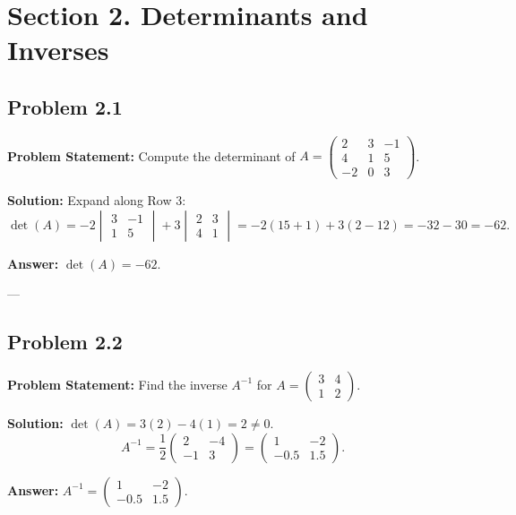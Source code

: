 \documentclass[11pt, a4paper]{article}
\begin{document}
\newpage

\section{Section 2. Determinants and Inverses}

\subsection*{Problem 2.1}
\textbf{Problem Statement:} Compute the determinant of $A = \begin{pmatrix} 2 & 3 & -1 \\ 4 & 1 & 5 \\ -2 & 0 & 3 \end{pmatrix}$.

\textbf{Solution:} Expand along Row 3:
$$ \det(A) = -2 \begin{vmatrix} 3 & -1 \\ 1 & 5 \end{vmatrix} + 3 \begin{vmatrix} 2 & 3 \\ 4 & 1 \end{vmatrix} = -2(15 + 1) + 3(2 - 12) = -32 - 30 = -62. $$

\textbf{Answer:} $\det(A) = -62$.

---

\subsection*{Problem 2.2}
\textbf{Problem Statement:} Find the inverse $A^{-1}$ for $A = \begin{pmatrix} 3 & 4 \\ 1 & 2 \end{pmatrix}$.

\textbf{Solution:} $\det(A) = 3(2) - 4(1) = 2 \ne 0$.
$$ A^{-1} = \frac{1}{2} \begin{pmatrix} 2 & -4 \\ -1 & 3 \end{pmatrix} = \begin{pmatrix} 1 & -2 \\ -0.5 & 1.5 \end{pmatrix}. $$

\textbf{Answer:} $A^{-1} = \begin{pmatrix} 1 & -2 \\ -0.5 & 1.5 \end{pmatrix}$.

\newpage
\end{document}
